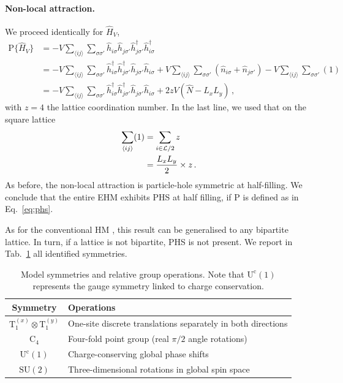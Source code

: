 \begin{tabproof}
	\paragraph{Non-local attraction.}
	
	We proceed identically for $\hat H_V$,
	\[
	\begin{aligned}
		\mathrm{P} \lbrace \hat H_V \rbrace &= - V \sum_{\langle ij \rangle} \sum_{\sigma \sigma'} \hat h_{i\sigma} \hat h_{j\sigma'} \hat h_{j\sigma'}^\dagger \hat h_{i\sigma}^\dagger \\
		&= - V \sum_{\langle ij \rangle} \sum_{\sigma \sigma'} \hat h_{i\sigma}^\dagger \hat h_{j\sigma'}^\dagger \hat h_{j\sigma'} \hat h_{i\sigma} + V \sum_{\langle ij \rangle} \sum_{\sigma \sigma'} \left(
			\hat n_{i\sigma} + \hat n_{j\sigma'}
		\right) - V \sum_{\langle ij \rangle} \sum_{\sigma \sigma'} (1) \\
		&= - V \sum_{\langle ij \rangle} \sum_{\sigma \sigma'} \hat h_{i\sigma}^\dagger \hat h_{j\sigma'}^\dagger \hat h_{j\sigma'} \hat h_{i\sigma} + 2zV (\hat N - L_x L_y) \, ,
	\end{aligned}
	\]
	with $z=4$ the lattice coordination number. In the last line, we used that on the square lattice
	\begin{align}
		\sum_{\ev{ij}} (1) &= \sum_{i\in\mathcal{L}/2} z \nonumber \\
		&= \frac{L_x L_y}{2} \times z \, . \label{eq:square-NN-ghost-sum}
	\end{align}
	As before, the non-local attraction is particle-hole symmetric at half-filling. We conclude that the entire EHM exhibits PHS at half filling, if $\mathrm{P}$ is defined as in Eq.~\eqref{eq:phs}.
\end{tabproof}
%
As for the conventional HM \cite{arovas2022hubbard}, this result can be generalised to any bipartite lattice. In turn, if a lattice is not bipartite, PHS is not present. We report in Tab.~\ref{tab:symmetry-groups} all identified symmetries.

\begin{table}
	\centering
	\begin{tabular}{c l}
		\textbf{Symmetry} & \textbf{Operations} \\
		\midrule
		$\mathrm{T}_1^{(x)} \otimes \mathrm{T}_1^{(y)}$ & One-site discrete translations separately in both directions \\
		$\mathrm{C}_4$ & Four-fold point group (real $\pi/2$ angle rotations) \\
		$\mathrm{U}^\mathrm{c}(1)$ & Charge-conserving global phase shifts \\
		$\mathrm{SU}(2)$ & Three-dimensional rotations in global spin space \\
		\midrule
	\end{tabular}
	\caption{Model symmetries and relative group operations. Note that $\mathrm{U}^\mathrm{c}(1)$ represents the gauge symmetry linked to charge conservation.}
	\label{tab:symmetry-groups}
\end{table}

